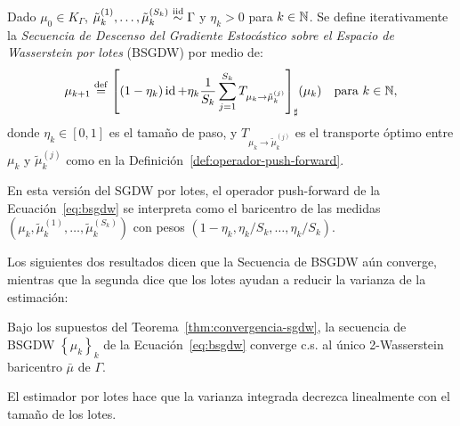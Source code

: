 \begin{definition}\label{def:bsgdw}
	Dado $\mu_0 \in K_\Gamma$, $\tilde \mu_k^{(1)}, \ldots, \tilde \mu_k^{(S_k)} \stackrel{\mathrm{iid}}{\sim} \Gamma$ y $\eta_k > 0$ para $k \in\mathbb{N}$. Se define iterativamente la \textit{Secuencia de Descenso del Gradiente Estocástico sobre el Espacio de Wasserstein por lotes} (BSGDW) por medio de:
	\begin{equation}
		\label{eq:bsgdw}
		\mu_{k+1} \stackrel{\mathrm{def}}{=} {\qty[
				(1 - \eta_k) \operatorname{id} + \eta_k \frac{1}{S_k} \sum_{j=1}^{S_k} T_{\mu_k \to \tilde \mu_k^{(j)}}
			]}_{\sharp} (\mu_k) \quad \text{para } k \in\mathbb{N},
	\end{equation}
	donde $\eta_k \in [0, 1]$ es el tamaño de paso, y $T_{\mu_k \to \tilde \mu_k^{(j)}}$ es el transporte óptimo entre $\mu_k$ y $\tilde \mu_k^{(j)}$ como en la Definición~\ref{def:operador-push-forward}.
\end{definition}

\begin{remark}
	En esta versión del SGDW por lotes, el operador push-forward de la Ecuación~\eqref{eq:bsgdw} se interpreta como el baricentro de las medidas $(\mu_k, \tilde \mu_k^{(1)}, \ldots, \tilde \mu_k^{(S_k)})$ con pesos $(1 - \eta_k, \eta_k/S_k, \ldots, \eta_k/S_k)$.
\end{remark}

Los siguientes dos resultados dicen que la Secuencia de BSGDW aún converge, mientras que la segunda dice que los lotes ayudan a reducir la varianza de la estimación:

\begin{proposition}
	Bajo los supuestos del Teorema~\ref{thm:convergencia-sgdw}, la secuencia de BSGDW $\left\{ \mu_k \right\}_k$ de la Ecuación~\eqref{eq:bsgdw} converge c.s. al único 2-Wasserstein baricentro $\bar \mu$ de $\Gamma$.
\end{proposition}

\begin{proposition}
	El estimador por lotes hace que la varianza integrada decrezca linealmente con el tamaño de los lotes.
\end{proposition}

